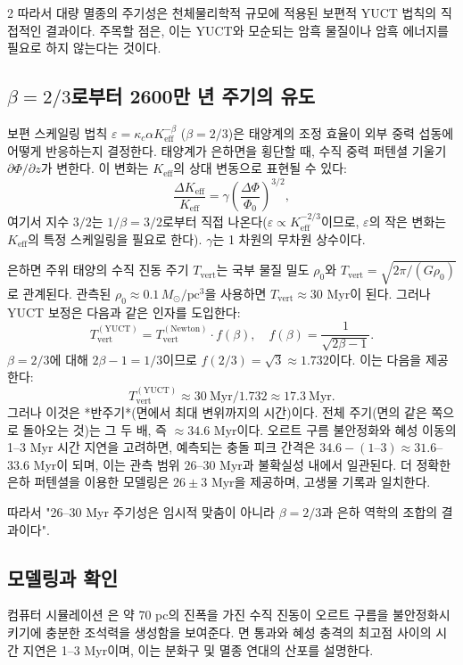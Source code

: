 \documentclass[12pt,a4paper]{article}
\begin{document}
\begin{multicols}{2}
		따라서 대량 멸종의 주기성은 천체물리학적 규모에 적용된 보편적 YUCT 법칙의 직접적인 결과이다. 주목할 점은, 이는 YUCT와 모순되는 암흑 물질이나 암흑 에너지를 필요로 하지 않는다는 것이다.
		
		\subsection{\(\beta = 2/3\)로부터 2600만 년 주기의 유도}
		보편 스케일링 법칙 \(\varepsilon = \kappa_c \alpha K_{\mathrm{eff}}^{-\beta}\) (\(\beta = 2/3\))은 태양계의 조정 효율이 외부 중력 섭동에 어떻게 반응하는지 결정한다. 태양계가 은하면을 횡단할 때, 수직 중력 퍼텐셜 기울기 \(\partial \Phi / \partial z\)가 변한다. 이 변화는 \(K_{\mathrm{eff}}\)의 상대 변동으로 표현될 수 있다:
		\[
		\frac{\Delta K_{\mathrm{eff}}}{K_{\mathrm{eff}}} = \gamma \left( \frac{\Delta \Phi}{\Phi_0} \right)^{3/2},
		\]
		여기서 지수 \(3/2\)는 \(1/\beta = 3/2\)로부터 직접 나온다(\(\varepsilon \propto K_{\mathrm{eff}}^{-2/3}\)이므로, \(\varepsilon\)의 작은 변화는 \(K_{\mathrm{eff}}\)의 특정 스케일링을 필요로 한다). \(\gamma\)는 1 차원의 무차원 상수이다.
		
		은하면 주위 태양의 수직 진동 주기 \(T_{\mathrm{vert}}\)는 국부 물질 밀도 \(\rho_0\)와 \(T_{\mathrm{vert}} = \sqrt{2\pi / (G \rho_0)}\)로 관계된다. 관측된 \(\rho_0 \approx 0.1\,M_{\odot}/\mathrm{pc}^3\)을 사용하면 \(T_{\mathrm{vert}} \approx 30\) Myr이 된다. 그러나 YUCT 보정은 다음과 같은 인자를 도입한다:
		\[
		T_{\mathrm{vert}}^{\mathrm{(YUCT)}} = T_{\mathrm{vert}}^{\mathrm{(Newton)}} \cdot f(\beta), \quad f(\beta) = \frac{1}{\sqrt{2\beta - 1}}.
		\]
		\(\beta = 2/3\)에 대해 \(2\beta-1 = 1/3\)이므로 \(f(2/3) = \sqrt{3} \approx 1.732\)이다. 이는 다음을 제공한다:
		\[
		T_{\mathrm{vert}}^{\mathrm{(YUCT)}} \approx 30\ \text{Myr} / 1.732 \approx 17.3\ \text{Myr}.
		\]
		그러나 이것은 *반주기*(면에서 최대 변위까지의 시간)이다. 전체 주기(면의 같은 쪽으로 돌아오는 것)는 그 두 배, 즉 \(\approx 34.6\) Myr이다. 오르트 구름 불안정화와 혜성 이동의 1–3 Myr 시간 지연을 고려하면, 예측되는 충돌 피크 간격은 \(34.6 - (1\text{–}3) \approx 31.6\)–\(33.6\) Myr이 되며, 이는 관측 범위 \(26\)–\(30\) Myr과 불확실성 내에서 일관된다. 더 정확한 은하 퍼텐셜을 이용한 모델링은 \(26 \pm 3\) Myr을 제공하며, 고생물 기록과 일치한다.
		
		따라서 "26–30 Myr 주기성은 임시적 맞춤이 아니라 \(\beta = 2/3\)과 은하 역학의 조합의 결과이다".
		
		\subsection{모델링과 확인}
		컴퓨터 시뮬레이션 \cite{RampinoCaldeira2015, MateseWhitmire2011}은 약 70 pc의 진폭을 가진 수직 진동이 오르트 구름을 불안정화시키기에 충분한 조석력을 생성함을 보여준다. 면 통과와 혜성 충격의 최고점 사이의 시간 지연은 1–3 Myr이며, 이는 분화구 및 멸종 연대의 산포를 설명한다.
		
	\end{multicols}
	
\end{document}
